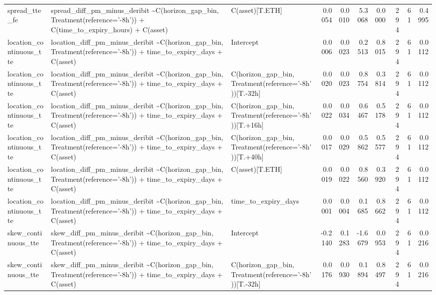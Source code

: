 \begin{table}
\begin{tabular}{lllrrrrrrr}
spread\_tte\_fe & spread\_diff\_pm\_minus\_deribit \textasciitilde \space C(horizon\_gap\_bin, Treatment(reference='-8h')) + C(time\_to\_expiry\_hours) + C(asset) & C(asset)[T.ETH] & 0.0054 & 0.0010 & 5.3068 & 0.0000 & 294 & 61 & 0.4995 \\
location\_continuous\_tte & location\_diff\_pm\_minus\_deribit \textasciitilde \space C(horizon\_gap\_bin, Treatment(reference='-8h')) + time\_to\_expiry\_days + C(asset) & Intercept & 0.0006 & 0.0023 & 0.2513 & 0.8015 & 294 & 61 & 0.0112 \\
location\_continuous\_tte & location\_diff\_pm\_minus\_deribit \textasciitilde \space C(horizon\_gap\_bin, Treatment(reference='-8h')) + time\_to\_expiry\_days + C(asset) & C(horizon\_gap\_bin, Treatment(reference='-8h'))[T.-32h] & 0.0020 & 0.0023 & 0.8754 & 0.3814 & 294 & 61 & 0.0112 \\
location\_continuous\_tte & location\_diff\_pm\_minus\_deribit \textasciitilde \space C(horizon\_gap\_bin, Treatment(reference='-8h')) + time\_to\_expiry\_days + C(asset) & C(horizon\_gap\_bin, Treatment(reference='-8h'))[T.+16h] & 0.0022 & 0.0034 & 0.6467 & 0.5178 & 294 & 61 & 0.0112 \\
location\_continuous\_tte & location\_diff\_pm\_minus\_deribit \textasciitilde \space C(horizon\_gap\_bin, Treatment(reference='-8h')) + time\_to\_expiry\_days + C(asset) & C(horizon\_gap\_bin, Treatment(reference='-8h'))[T.+40h] & 0.0017 & 0.0029 & 0.5862 & 0.5577 & 294 & 61 & 0.0112 \\
location\_continuous\_tte & location\_diff\_pm\_minus\_deribit \textasciitilde \space C(horizon\_gap\_bin, Treatment(reference='-8h')) + time\_to\_expiry\_days + C(asset) & C(asset)[T.ETH] & 0.0019 & 0.0022 & 0.8560 & 0.3920 & 294 & 61 & 0.0112 \\
location\_continuous\_tte & location\_diff\_pm\_minus\_deribit \textasciitilde \space C(horizon\_gap\_bin, Treatment(reference='-8h')) + time\_to\_expiry\_days + C(asset) & time\_to\_expiry\_days & 0.0001 & 0.0004 & 0.1685 & 0.8662 & 294 & 61 & 0.0112 \\
skew\_continuous\_tte & skew\_diff\_pm\_minus\_deribit \textasciitilde \space C(horizon\_gap\_bin, Treatment(reference='-8h')) + time\_to\_expiry\_days + C(asset) & Intercept & -0.2140 & 0.1283 & -1.6679 & 0.0953 & 294 & 61 & 0.0216 \\
skew\_continuous\_tte & skew\_diff\_pm\_minus\_deribit \textasciitilde \space C(horizon\_gap\_bin, Treatment(reference='-8h')) + time\_to\_expiry\_days + C(asset) & C(horizon\_gap\_bin, Treatment(reference='-8h'))[T.-32h] & 0.0176 & 0.0930 & 0.1894 & 0.8497 & 294 & 61 & 0.0216 \\

\end{tabular}
\end{table}
